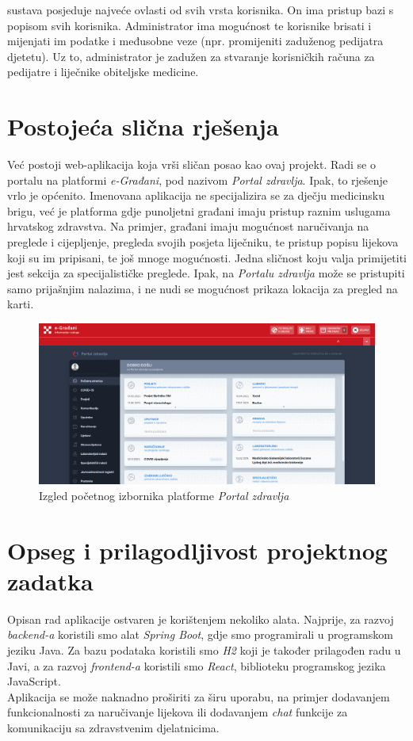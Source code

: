 		 sustava posjeduje najveće ovlasti od svih vrsta korisnika. On ima pristup bazi s popisom svih korisnika. Administrator ima mogućnost te korisnike brisati i mijenjati im podatke i međusobne veze (npr. promijeniti zaduženog pedijatra djetetu). Uz to, administrator je zadužen za stvaranje korisničkih računa za pedijatre i liječnike obiteljske medicine.\\
		
		\section{Postojeća slična rješenja}
		Već postoji web-aplikacija koja vrši sličan posao kao ovaj projekt. Radi se o portalu na platformi \textit{e-Građani}, pod nazivom \textit{Portal zdravlja}. Ipak, to rješenje vrlo je općenito. Imenovana aplikacija ne specijalizira se za dječju medicinsku brigu, već je platforma gdje punoljetni građani imaju pristup raznim uslugama hrvatskog zdravstva. Na primjer, građani imaju mogućnost naručivanja na preglede i cijepljenje, pregleda svojih posjeta liječniku, te pristup popisu lijekova koji su im pripisani, te još mnoge mogućnosti. Jedna sličnost koju valja primijetiti jest sekcija za specijalističke preglede. Ipak, na \textit{Portalu zdravlja} može se pristupiti samo prijašnjim nalazima, i ne nudi se mogućnost prikaza lokacija za pregled na karti.
		\begin{figure}[H]
			\includegraphics[scale=0.4]{slike/portalzdravlje.PNG} %
			\centering
			\caption{Izgled početnog izbornika platforme \textit{Portal zdravlja}}
			\label{fig:portal-zdravlja}
		\end{figure}
		
		\section{Opseg i prilagodljivost projektnog zadatka}
		Opisan rad aplikacije ostvaren je korištenjem nekoliko alata. Najprije, za razvoj \textit{backend-a} koristili smo alat \textit{Spring Boot}, gdje smo programirali u programskom jeziku Java. Za bazu podataka koristili smo \textit{H2} koji je također prilagođen radu u Javi, a za razvoj \textit{frontend-a} koristili smo \textit{React}, biblioteku programskog jezika JavaScript. \\
		Aplikacija se može naknadno proširiti za širu uporabu, na primjer dodavanjem funkcionalnosti za naručivanje lijekova ili dodavanjem \textit{chat} funkcije za komunikaciju sa zdravstvenim djelatnicima.
		
		
	